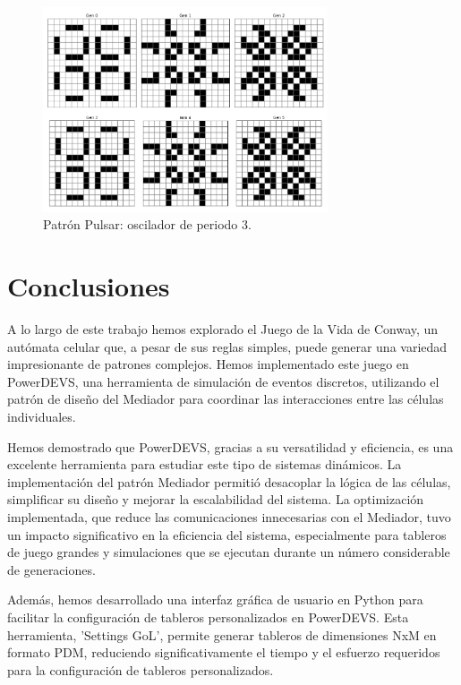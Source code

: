\documentclass[]{article}
\begin{document}
\begin{figure}[H]
  \centering
  \includegraphics[width=0.75\textwidth]{../assets/oscillator/pulsar/pulsar.png}
  \caption{Patrón Pulsar: oscilador de periodo 3.}
  \label{fig:pulsar}
\end{figure}




\section{Conclusiones}

A lo largo de este trabajo hemos explorado el Juego de la Vida de Conway, un autómata celular que, a pesar de sus reglas simples, puede generar una variedad impresionante de patrones complejos. Hemos implementado este juego en PowerDEVS, una herramienta de simulación de eventos discretos, utilizando el patrón de diseño del Mediador para coordinar las interacciones entre las células individuales. 

Hemos demostrado que PowerDEVS, gracias a su versatilidad y eficiencia, es una excelente herramienta para estudiar este tipo de sistemas dinámicos. La implementación del patrón Mediador permitió desacoplar la lógica de las células, simplificar su diseño y mejorar la escalabilidad del sistema. La optimización implementada, que reduce las comunicaciones innecesarias con el Mediador, tuvo un impacto significativo en la eficiencia del sistema, especialmente para tableros de juego grandes y simulaciones que se ejecutan durante un número considerable de generaciones.

Además, hemos desarrollado una interfaz gráfica de usuario en Python para facilitar la configuración de tableros personalizados en PowerDEVS. Esta herramienta, 'Settings GoL', permite generar tableros de dimensiones NxM en formato PDM, reduciendo significativamente el tiempo y el esfuerzo requeridos para la configuración de tableros personalizados.
\end{document}
